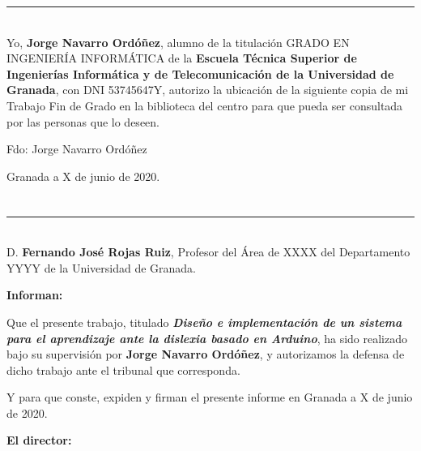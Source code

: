 \noindent\rule[-1ex]{\textwidth}{2pt}\\[4.5ex]

Yo, \textbf{Jorge Navarro Ordóñez}, alumno de la titulación GRADO EN INGENIERÍA INFORMÁTICA de la \textbf{Escuela Técnica Superior
de Ingenierías Informática y de Telecomunicación de la Universidad de Granada}, con DNI 53745647Y, autorizo la
ubicación de la siguiente copia de mi Trabajo Fin de Grado en la biblioteca del centro para que pueda ser
consultada por las personas que lo deseen.

\vspace{6cm}

\noindent Fdo: Jorge Navarro Ordóñez

\vspace{2cm}

\begin{flushright}
Granada a X de junio de 2020.
\end{flushright}


\chapter*{}
\thispagestyle{empty}

\noindent\rule[-1ex]{\textwidth}{2pt}\\[4.5ex]

D. \textbf{Fernando José Rojas Ruiz}, Profesor del Área de XXXX del Departamento YYYY de la Universidad de Granada.

\vspace{0.5cm}

\textbf{Informan:}

\vspace{0.5cm}

Que el presente trabajo, titulado \textit{\textbf{Diseño e implementación de un sistema para el aprendizaje ante la dislexia basado en Arduino}},
ha sido realizado bajo su supervisión por \textbf{Jorge Navarro Ordóñez}, y autorizamos la defensa de dicho trabajo ante el tribunal
que corresponda.

\vspace{0.5cm}

Y para que conste, expiden y firman el presente informe en Granada a X de junio de 2020.

\vspace{1cm}

\textbf{El director:}

\vspace{5cm}

